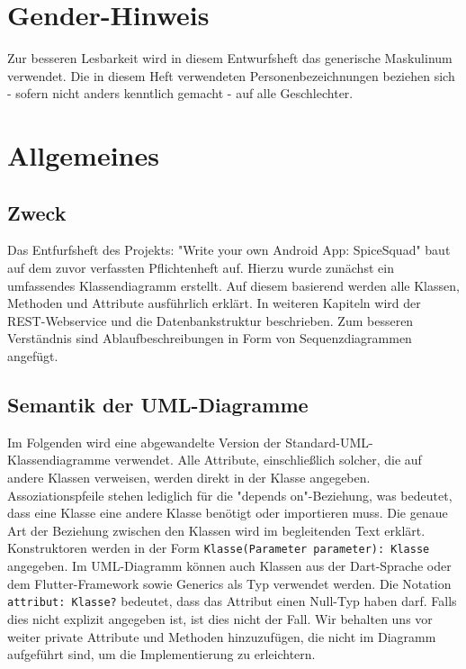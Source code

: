 \documentclass{entwurfsheft}
\begin{document}

\maketitle
\tableofcontents
\newpage

\section*{Gender-Hinweis}
Zur besseren Lesbarkeit wird in diesem Entwurfsheft das generische Maskulinum verwendet.
Die in diesem Heft verwendeten Personenbezeichnungen beziehen sich - sofern nicht anders kenntlich gemacht - auf alle Geschlechter.
\newpage

\section{Allgemeines}
\subsection{Zweck}
Das Entfurfsheft des Projekts: "Write your own Android App: SpiceSquad" baut auf dem zuvor verfassten Pflichtenheft auf.
Hierzu wurde zunächst ein umfassendes Klassendiagramm erstellt. Auf diesem basierend werden alle Klassen, Methoden und Attribute ausführlich erklärt.
In weiteren Kapiteln wird der REST-Webservice und die Datenbankstruktur beschrieben. Zum besseren Verständnis sind Ablaufbeschreibungen in Form von Sequenzdiagrammen angefügt.

\subsection{Semantik der UML-Diagramme}
Im Folgenden wird eine abgewandelte Version der Standard-UML-Klassendiagramme verwendet. Alle Attribute, einschließlich solcher, die auf andere Klassen verweisen, werden direkt in der Klasse angegeben. Assoziationspfeile stehen lediglich für die "depends on"-Beziehung, was bedeutet, dass eine Klasse eine andere Klasse benötigt oder importieren muss. Die genaue Art der Beziehung zwischen den Klassen wird im begleitenden Text erklärt. Konstruktoren werden in der Form \texttt{Klasse(Parameter parameter): Klasse} angegeben. Im UML-Diagramm können auch Klassen aus der Dart-Sprache oder dem Flutter-Framework sowie Generics als Typ verwendet werden. Die Notation \texttt{attribut: Klasse?} bedeutet, dass das Attribut einen Null-Typ haben darf. Falls dies nicht explizit angegeben ist, ist dies nicht der Fall.
Wir behalten uns vor weiter private Attribute und Methoden hinzuzufügen, die nicht im Diagramm aufgeführt sind, um die Implementierung zu erleichtern.
\end{document}
